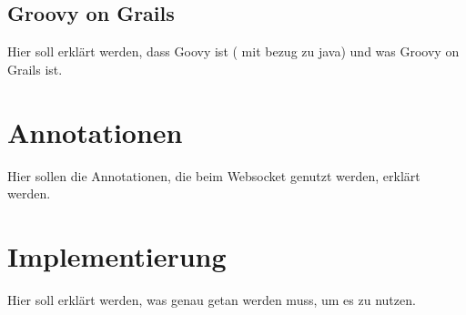 \subsection{Groovy on Grails}

Hier soll erklärt werden, dass Goovy ist ( mit bezug zu java) und was Groovy on Grails ist.

\section{Annotationen}

Hier sollen die Annotationen, die beim Websocket genutzt werden, erklärt werden.

\section{Implementierung}

Hier soll erklärt werden, was genau getan werden muss, um es zu nutzen.


